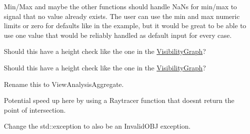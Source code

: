 
\begin{DoxyRefList}
\item[Member \mbox{\hyperlink{a00275_abd3ed7f9595c30784ca668bf886a8d77}{HF\+::Analysis\+Methods\+::View\+Analysis\+::Aggregate}} (float \&out\+\_\+total, float new\+\_\+value, const A\+G\+G\+R\+E\+G\+A\+T\+E\+\_\+\+T\+Y\+PE agg\+\_\+type, int count=0)]\label{a00264__todo000001}%
%
Min/\+Max and maybe the other functions should handle Na\+Ns for min/max to signal that no value already exists. The user can use the min and max numeric limits or zero for defaults like in the example, but it would be great to be able to use one value that would be reliably handled as default input for every case.  
\item[Member \mbox{\hyperlink{a00270_ga8090bf1d24c0cff934daba1c76d82ba6}{HF\+::Analysis\+Methods\+::View\+Analysis\+::Spherical\+View\+Analysis}} (RT \&ray\+\_\+tracer, const std\+::vector$<$ N $>$ \&Nodes, int num\+\_\+rays, float upward\+\_\+limit=50.\+0f, float downward\+\_\+limit=70.\+0f, float height=1.\+7f)]\label{a00264__todo000002}%
%
Should this have a height check like the one in the \mbox{\hyperlink{a00278}{Visibility\+Graph}}? 
\item[Member \mbox{\hyperlink{a00270_ga249100bce7370ba4202f47294f179f81}{HF\+::Analysis\+Methods\+::View\+Analysis\+::Spherical\+Rayshoot\+With\+Any\+R\+T\+For\+Distance}} (RT \&ray\+\_\+tracer, const std\+::vector$<$ N $>$ \&Nodes, int num\+\_\+rays, float upward\+\_\+limit=50.\+0f, float downward\+\_\+limit=70.\+0f, float height=1.\+7f, const A\+G\+G\+R\+E\+G\+A\+T\+E\+\_\+\+T\+Y\+PE aggregation=\mbox{\hyperlink{a00275_a0a616a205221414bf7aa28966b461deca6970bdc2201030b9c03fbdcf3973858a}{A\+G\+G\+R\+E\+G\+A\+T\+E\+\_\+\+T\+Y\+P\+E\+::\+S\+UM}})]\label{a00264__todo000003}%
%
Should this have a height check like the one in the \mbox{\hyperlink{a00278}{Visibility\+Graph}}?

\label{a00264__todo000004}%
%
Rename this to View\+Analysis\+Aggregate.

\label{a00264__todo000005}%
%
Potential speed up here by using a Raytracer function that doesn\textquotesingle{}t return the point of intersection.  
\item[Member \mbox{\hyperlink{a01127_af564a1fb0a0389878edf369b653164fb}{HF\+::Geometry\+::Mesh\+Info\+::Mesh\+Info}} (const std\+::vector$<$ std\+::array$<$ float, 3 $>$$>$ \&vertices, int id, std\+::string name=\char`\"{}\char`\"{})]\label{a00264__todo000006}%
%
Change the std\+::exception to also be an Invalid\+O\+BJ exception. 


\end{DoxyRefList}
